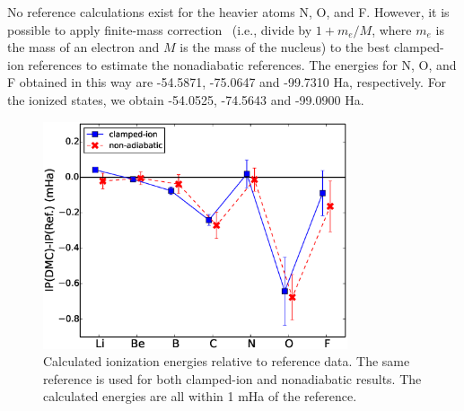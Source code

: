 No reference calculations exist for the heavier atoms N, O, and F. However, it is possible to apply finite-mass correction~\cite{Davidson_Atoms,Cencek_LiH} (i.e., divide by $1+m_e/M$, where $m_e$ is the mass of an electron and $M$ is the mass of the nucleus) to the best clamped-ion references to estimate the nonadiabatic references. The energies for N, O, and F obtained in this way are -54.5871, -75.0647 and -99.7310 Ha, respectively. For the ionized states, we obtain -54.0525, -74.5643 and -99.0900 Ha. %

\begin{figure}[h]
\centering
\includegraphics[width=0.8\textwidth]{ionization}
\caption{Calculated ionization energies relative to reference data. The same reference is used for both clamped-ion and nonadiabatic results. The calculated energies are all within 1 mHa of the reference. \label{fig:ionization}}
\end{figure}


